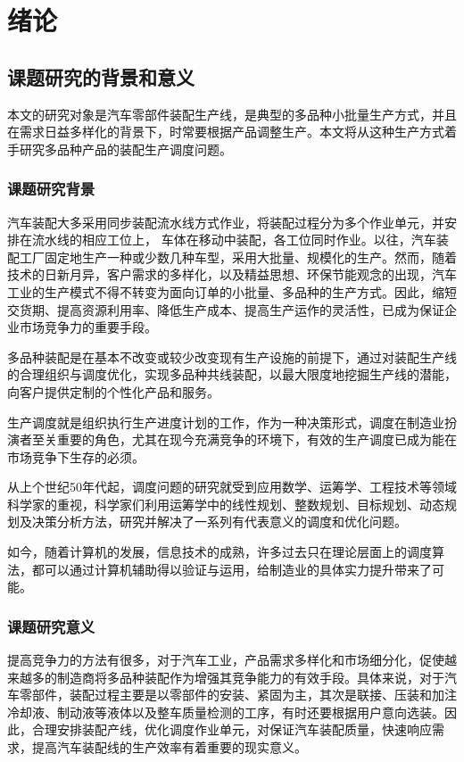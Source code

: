 \chapter{绪论}
\section{课题研究的背景和意义}
本文的研究对象是汽车零部件装配生产线，是典型的多品种小批量生产方式，并且在需求日益多样化的背景下，时常要根据产品调整生产。本文将从这种生产方式着手研究多品种产品的装配生产调度问题。

\subsection{课题研究背景}
汽车装配大多采用同步装配流水线方式作业，将装配过程分为多个作业单元，并安排在流水线的相应工位上，
车体在移动中装配，各工位同时作业。以往，汽车装配工厂固定地生产一种或少数几种车型，采用大批量、规模化的生产。然而，随着技术的日新月异，客户需求的多样化，以及精益思想、环保节能观念的出现，汽车工业的生产模式不得不转变为面向订单的小批量、多品种的生产方式。因此，缩短交货期、提高资源利用率、降低生产成本、提高生产运作的灵活性，已成为保证企业市场竞争力的重要手段。

多品种装配是在基本不改变或较少改变现有生产设施的前提下，通过对装配生产线的合理组织与调度优化，实现多品种共线装配，以最大限度地挖掘生产线的潜能，向客户提供定制的个性化产品和服务。

生产调度就是组织执行生产进度计划的工作，作为一种决策形式，调度在制造业扮演者至关重要的角色，尤其在现今充满竞争的环境下，有效的生产调度已成为能在市场竞争下生存的必须。

从上个世纪50年代起，调度问题的研究就受到应用数学、运筹学、工程技术等领域科学家的重视，科学家们利用运筹学中的线性规划、整数规划、目标规划、动态规划及决策分析方法，研究并解决了一系列有代表意义的调度和优化问题\cite{徐俊刚2004}。

如今，随着计算机的发展，信息技术的成熟，许多过去只在理论层面上的调度算法，都可以通过计算机辅助得以验证与运用，给制造业的具体实力提升带来了可能。

\subsection{课题研究意义}
提高竞争力的方法有很多，对于汽车工业，产品需求多样化和市场细分化，促使越来越多的制造商将多品种装配作为增强其竞争能力的有效手段。具体来说，对于汽车零部件，装配过程主要是以零部件的安装、紧固为主，其次是联接、压装和加注冷却液、制动液等液体以及整车质量检测的工序，有时还要根据用户意向选装。因此，合理安排装配产线，优化调度作业单元，对保证汽车装配质量，快速响应需求，提高汽车装配线的生产效率有着重要的现实意义。

